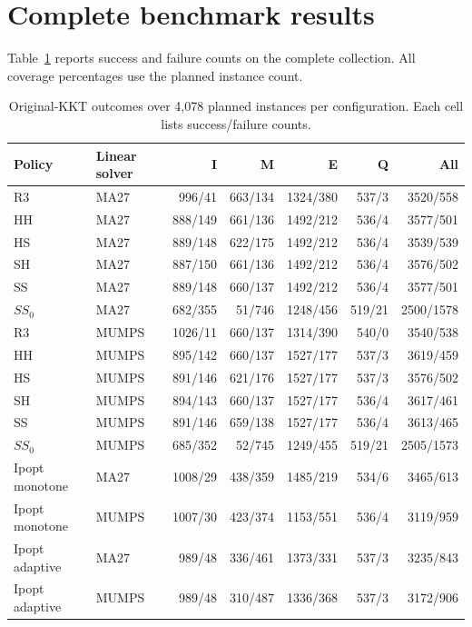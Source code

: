 \documentclass[pdflatex,sn-mathphys-num]{sn-jnl}
\theoremstyle{thmstyleone}
\theoremstyle{thmstylethree}
\begin{document}
\FloatBarrier

\section{Complete benchmark results}\label{app:complete-results}
Table~\ref{tab:global-classifications} reports success and failure counts
on the complete collection. All coverage percentages use the planned
instance count.
\begin{table}[!htbp]
\centering\small
\caption{Original-KKT outcomes over 4,078 planned instances per
configuration. Each cell lists success/failure counts.}
\label{tab:global-classifications}

\begin{tabular}{@{}llrrrrr@{}}
\toprule
Policy & Linear solver & I & M & E & Q & All \\
\midrule
R3 & MA27 & 996/41 & 663/134 & 1324/380 & 537/3 & 3520/558 \\
HH & MA27 & 888/149 & 661/136 & 1492/212 & 536/4 & 3577/501 \\
HS & MA27 & 889/148 & 622/175 & 1492/212 & 536/4 & 3539/539 \\
SH & MA27 & 887/150 & 661/136 & 1492/212 & 536/4 & 3576/502 \\
SS & MA27 & 889/148 & 660/137 & 1492/212 & 536/4 & 3577/501 \\
$SS_0$ & MA27 & 682/355 & 51/746 & 1248/456 & 519/21 & 2500/1578 \\
R3 & MUMPS & 1026/11 & 660/137 & 1314/390 & 540/0 & 3540/538 \\
HH & MUMPS & 895/142 & 660/137 & 1527/177 & 537/3 & 3619/459 \\
HS & MUMPS & 891/146 & 621/176 & 1527/177 & 537/3 & 3576/502 \\
SH & MUMPS & 894/143 & 660/137 & 1527/177 & 536/4 & 3617/461 \\
SS & MUMPS & 891/146 & 659/138 & 1527/177 & 536/4 & 3613/465 \\
$SS_0$ & MUMPS & 685/352 & 52/745 & 1249/455 & 519/21 & 2505/1573 \\
Ipopt monotone & MA27 & 1008/29 & 438/359 & 1485/219 & 534/6 & 3465/613 \\
Ipopt monotone & MUMPS & 1007/30 & 423/374 & 1153/551 & 536/4 & 3119/959 \\
Ipopt adaptive & MA27 & 989/48 & 336/461 & 1373/331 & 537/3 & 3235/843 \\
Ipopt adaptive & MUMPS & 989/48 & 310/487 & 1336/368 & 537/3 & 3172/906 \\
\bottomrule
\end{tabular}


\end{table}
\end{document}
